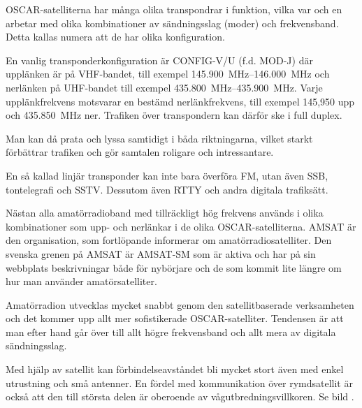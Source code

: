 OSCAR-satelliterna har många olika transpondrar i funktion, vilka var och en
arbetar med olika kombinationer av sändningsslag (moder) och frekvensband.
Detta kallas numera att de har olika konfiguration.

En vanlig transponderkonfiguration är CONFIG-V/U (f.d. MOD-J) där upplänken
är på VHF-bandet, till exempel \SIrange{145,900}{146,000}{\mega\hertz} och
nerlänken på UHF-bandet till exempel \SIrange{435,800}{435,900}{\mega\hertz}.
Varje upplänkfrekvens motsvarar en bestämd nerlänkfrekvens, till exempel 
145,950 upp och \SI{435,850}{\mega\hertz} ner.
Trafiken över transpondern kan därför ske i full duplex.

Man kan då prata och lyssa samtidigt i båda riktningarna, vilket
starkt förbättrar trafiken och gör samtalen roligare och intressantare.

En så kallad linjär transponder kan inte bara överföra FM, utan även SSB,
tontelegrafi och SSTV.
Dessutom även RTTY och andra digitala trafiksätt.

Nästan alla amatörradioband med tillräckligt hög frekvens används i
olika kombinationer som upp- och nerlänkar i de olika OSCAR-satelliterna.
AMSAT är den organisation, som fortlöpande informerar om amatörradiosatelliter.
Den svenska grenen på AMSAT är AMSAT-SM som är aktiva och har på sin webbplats
beskrivningar både för nybörjare och de som kommit lite längre om hur man
använder amatörsatelliter.


Amatörradion utvecklas mycket snabbt genom den satellitbaserade
verksamheten och det kommer upp allt mer sofistikerade OSCAR-satelliter.
Tendensen är att man efter hand går över till allt
högre frekvensband och allt mera av digitala sändningsslag.

Med hjälp av satellit kan förbindelseavståndet bli mycket stort även
med enkel utrustning och små antenner.
En fördel med kommunikation över rymdsatellit är också att den till största
delen är oberoende av vågutbredningsvillkoren.
%
Se bild .
